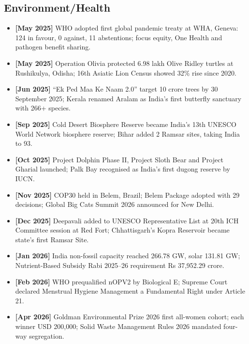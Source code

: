 \documentclass[10pt,a4paper]{article}
\newcommand{\monthtag}[1]{\textbf{[#1]}}
\newcommand{\fact}[2]{\item \monthtag{#1} #2}
\begin{document}
\subsection{Environment/Health}
\begin{itemize}
    \fact{May 2025}{WHO adopted first global pandemic treaty at WHA, Geneva: 124 in favour, 0 against, 11 abstentions; focus equity, One Health and pathogen benefit sharing.}
    \fact{May 2025}{Operation Olivia protected 6.98 lakh Olive Ridley turtles at Rushikulya, Odisha; 16th Asiatic Lion Census showed 32\% rise since 2020.}
    \fact{Jun 2025}{``Ek Ped Maa Ke Naam 2.0'' target 10 crore trees by 30 September 2025; Kerala renamed Aralam as India's first butterfly sanctuary with 266+ species.}
    \fact{Sep 2025}{Cold Desert Biosphere Reserve became India's 13th UNESCO World Network biosphere reserve; Bihar added 2 Ramsar sites, taking India to 93.}
    \fact{Oct 2025}{Project Dolphin Phase II, Project Sloth Bear and Project Gharial launched; Palk Bay recognised as India's first dugong reserve by IUCN.}
    \fact{Nov 2025}{COP30 held in Belem, Brazil; Belem Package adopted with 29 decisions; Global Big Cats Summit 2026 announced for New Delhi.}
    \fact{Dec 2025}{Deepavali added to UNESCO Representative List at 20th ICH Committee session at Red Fort; Chhattisgarh's Kopra Reservoir became state's first Ramsar Site.}
    \fact{Jan 2026}{India non-fossil capacity reached 266.78 GW, solar 131.81 GW; Nutrient-Based Subsidy Rabi 2025--26 requirement Rs 37,952.29 crore.}
    \fact{Feb 2026}{WHO prequalified nOPV2 by Biological E; Supreme Court declared Menstrual Hygiene Management a Fundamental Right under Article 21.}
    \fact{Apr 2026}{Goldman Environmental Prize 2026 first all-women cohort; each winner USD 200,000; Solid Waste Management Rules 2026 mandated four-way segregation.}
\end{itemize}
\end{document}
